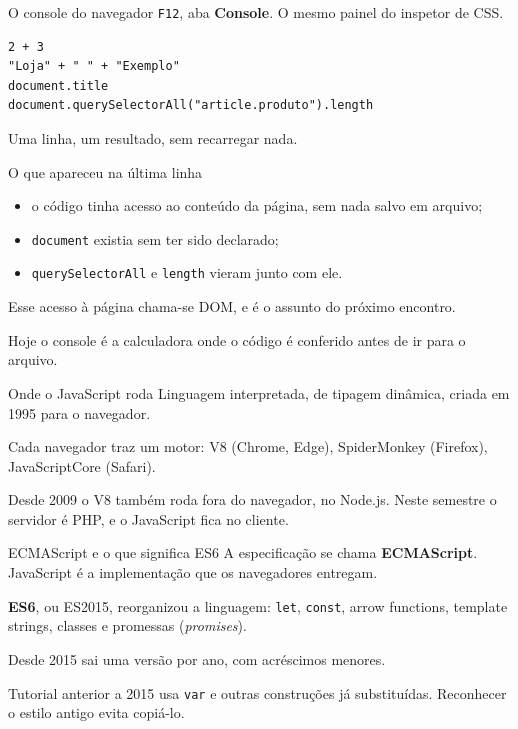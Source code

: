 \documentclass{beamer}
\begin{document}
\begin{frame}[fragile]{O console do navegador}
	\texttt{F12}, aba \textbf{Console}. O mesmo painel do inspetor de CSS.

	\begin{verbatim}
2 + 3
"Loja" + " " + "Exemplo"
document.title
document.querySelectorAll("article.produto").length
	\end{verbatim}

	\vspace{0.3cm}
	Uma linha, um resultado, sem recarregar nada.
\end{frame}

\begin{frame}{O que apareceu na última linha}
	\begin{itemize}
		\item o código tinha acesso ao conteúdo da página, sem nada salvo em
		      arquivo;
		\item \texttt{document} existia sem ter sido declarado;
		\item \texttt{querySelectorAll} e \texttt{length} vieram junto com ele.
	\end{itemize}

	\vspace{0.5cm}
	Esse acesso à página chama-se DOM, e é o assunto do próximo encontro.

	\vspace{0.3cm}
	Hoje o console é a calculadora onde o código é conferido antes de ir para o
	arquivo.
\end{frame}

\begin{frame}{Onde o JavaScript roda}
	Linguagem interpretada, de tipagem dinâmica, criada em 1995 para o navegador.

	\vspace{0.3cm}
	Cada navegador traz um motor: V8 (Chrome, Edge), SpiderMonkey (Firefox),
	JavaScriptCore (Safari).

	\vspace{0.3cm}
	Desde 2009 o V8 também roda fora do navegador, no Node.js. Neste semestre o
	servidor é PHP, e o JavaScript fica no cliente.
\end{frame}

\begin{frame}{ECMAScript e o que significa ES6}
	A especificação se chama \textbf{ECMAScript}. JavaScript é a implementação
	que os navegadores entregam.

	\vspace{0.4cm}
	\textbf{ES6}, ou ES2015, reorganizou a linguagem: \texttt{let}, \texttt{const},
	arrow functions, template strings, classes e promessas (\emph{promises}).

	\vspace{0.4cm}
	Desde 2015 sai uma versão por ano, com acréscimos menores.

	\vspace{0.4cm}
	Tutorial anterior a 2015 usa \texttt{var} e outras construções já
	substituídas. Reconhecer o estilo antigo evita copiá-lo.
\end{frame}
\end{document}
